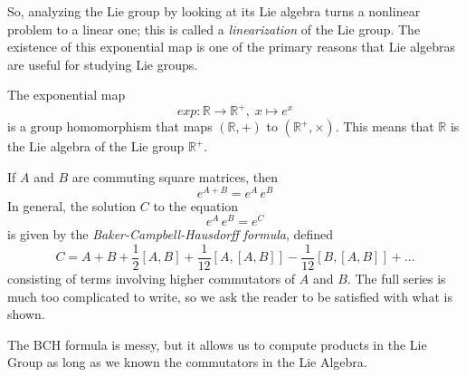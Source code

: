 \documentclass{article}
\begin{document}
    \begin{center}
    \end{center}
    So, analyzing the Lie group by looking at its Lie algebra turns a nonlinear problem to a linear one; this is called a \textit{linearization} of the Lie group. The existence of this exponential map is one of the primary reasons that Lie algebras are useful for studying Lie groups. 

    \begin{example}
      The exponential map 
      \begin{equation}
        exp: \mathbb{R} \longrightarrow \mathbb{R}^+, \; x \mapsto e^x
      \end{equation}
      is a group homomorphism that maps $(\mathbb{R}, +)$ to $(\mathbb{R}^+, \times)$. This means that $\mathbb{R}$ is the Lie algebra of the Lie group $\mathbb{R}^+$. 
    \end{example}

    \begin{theorem}
      If $A$ and $B$ are commuting square matrices, then 
      \begin{equation}
        e^{A + B} = e^A \, e^B
      \end{equation}
      In general, the solution $C$ to the equation
      \begin{equation}
        e^{A} \, e^B = e^C
      \end{equation}
      is given by the \textit{Baker-Campbell-Hausdorff formula}, defined
      \begin{equation}
        C = A + B + \frac{1}{2}[A,B] + \frac{1}{12} [A,[A,B]] - \frac{1}{12} [B,[A,B]] + ...
      \end{equation}
      consisting of terms involving higher commutators of $A$ and $B$. The full series is much too complicated to write, so we ask the reader to be satisfied with what is shown. 
    \end{theorem}

    The BCH formula is messy, but it allows us to compute products in the Lie Group as long as we known the commutators in the Lie Algebra. 
\end{document}
